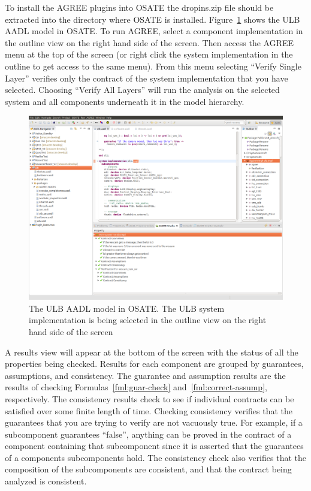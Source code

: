 \documentclass{llncs}
\begin{document}
To install the AGREE plugins into OSATE the dropins.zip file should be extracted into the directory where OSATE is installed.
Figure~\ref{fig:osate} shows the ULB AADL model in OSATE. To run AGREE, select a component implementation in the outline view on the right hand side of the screen.  Then access the AGREE menu at the top of the screen (or right click the system implementation in the outline to get access to the same menu).  From this menu selecting ``Verify Single Layer'' verifies only the contract of the system implementation that you have selected.  Choosing ``Verify All Layers'' will run the analysis on the selected system and all components underneath it in the model hierarchy.

\begin{figure}
\includegraphics[scale=0.225]{analysis1.png}
\caption{The ULB AADL model in OSATE.  The ULB system implementation is being selected in the outline view on the right hand side of the screen}
\label{fig:osate}
\end{figure}

A results view will appear at the bottom of the screen with the status of all the properties being checked. Results for each component are grouped by guarantees, assumptions, and consistency.  The guarantee and assumption results are the results of checking Formulas~\ref{fml:guar-check} and~\ref{fml:correct-assump}, respectively.  The consistency results check to see if individual contracts can be satisfied over some finite length of time. Checking consistency verifies that the guarantees that you are trying to verify are not vacuously true.  For example, if a subcomponent guarantees ``false'', anything can be proved in the contract of a component containing that subcomponent since it is asserted that the guarantees of a components subcomponents hold.  The consistency check also verifies that the composition of the subcomponents are consistent, and that the contract being analyzed is consistent.
\end{document}
